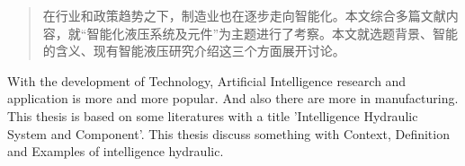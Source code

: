 
\begin{abstract}

在行业和政策趋势之下，制造业也在逐步走向智能化。本文综合多篇文献内容，就“智能化液压系统及元件”为主题进行了考察。本文就选题背景、智能的含义、现有智能液压研究介绍这三个方面展开讨论。

\end{abstract}

\begin{englishabstract}

With the development of Technology, Artificial Intelligence research and application is more and more popular. And also there are more in manufacturing. This thesis is based on some literatures with a title 'Intelligence Hydraulic System and Component'. This thesis discuss something with Context, Definition and Examples of intelligence hydraulic.

\end{englishabstract}

